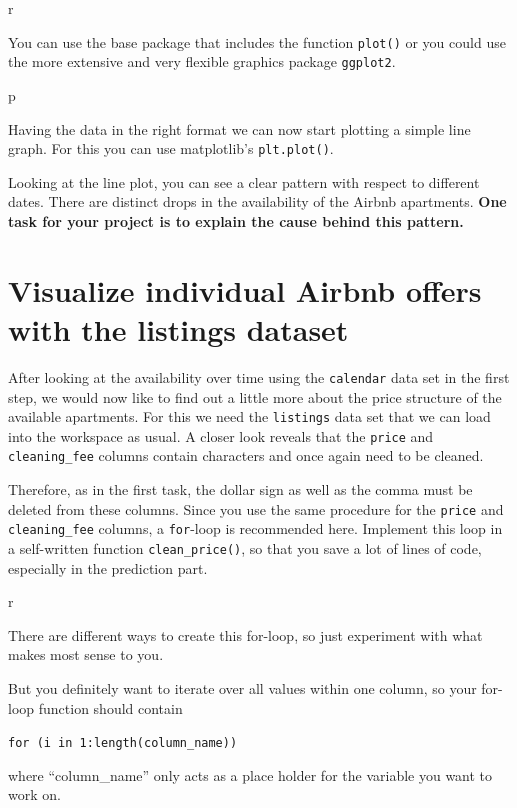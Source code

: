 \documentclass[
  11pt,
]{book}
\begin{document}
\begin{tips}r

You can use the base package that includes the function \texttt{plot()}
or you could use the more extensive and very flexible graphics package
\texttt{ggplot2}.

\end{tips}

\begin{tipsp}p

Having the data in the right format we can now start plotting a simple
line graph. For this you can use matplotlib's \texttt{plt.plot()}.

\end{tipsp}

Looking at the line plot, you can see a clear pattern with respect to
different dates. There are distinct drops in the availability of the
Airbnb apartments. \textbf{One task for your project is to explain the
cause behind this pattern.}

\hypertarget{visualize-individual-airbnb-offers-with-the-listings-dataset}{%
\section{Visualize individual Airbnb offers with the listings
dataset}\label{visualize-individual-airbnb-offers-with-the-listings-dataset}}

After looking at the availability over time using the \texttt{calendar}
data set in the first step, we would now like to find out a little more
about the price structure of the available apartments. For this we need
the \texttt{listings} data set that we can load into the workspace as
usual. A closer look reveals that the \texttt{price} and
\texttt{cleaning\_fee} columns contain characters and once again need to
be cleaned.

Therefore, as in the first task, the dollar sign as well as the comma
must be deleted from these columns. Since you use the same procedure for
the \texttt{price} and \texttt{cleaning\_fee} columns, a
\texttt{for}-loop is recommended here. Implement this loop in a
self-written function \texttt{clean\_price()}, so that you save a lot of
lines of code, especially in the prediction part.

\begin{tips}r

There are different ways to create this for-loop, so just experiment
with what makes most sense to you.

But you definitely want to iterate over all values within one column, so
your for-loop function should contain

\texttt{for\ (i\ in\ 1:length(column\_name))}

where ``column\_name'' only acts as a place holder for the variable you
want to work on.

\end{tips}
\end{document}

